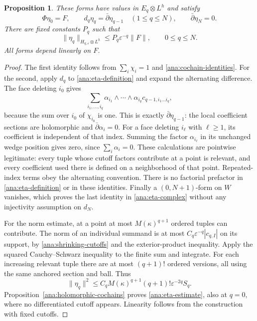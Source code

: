 \documentclass[11pt,reqno]{amsart}
\numberwithin{equation}{section}
\newtheorem{proposition}[theorem]{Proposition}
\theoremstyle{definition}
\theoremstyle{remark}
\begin{document}
\begin{proposition}\label{ana:eta-identities}
These forms have values in $E_q\otimes L^h$ and satisfy
\begin{equation}\label{ana:eta-complex}
 \Phi\eta_0=F,
 \qquad
 d_q\eta_q=\bar\partial\eta_{q-1}\quad(1\leq q\leq N),
 \qquad
 \bar\partial\eta_N=0.
\end{equation}
There are fixed constants $P_q$ such that
\begin{equation}\label{ana:eta-estimate}
 \|\eta_q\|_{H_{q,\varepsilon}\otimes L^h}
 \leq P_q\varepsilon^{-q}\|F\|,
 \qquad 0\leq q\leq N.
\end{equation}
All forms depend linearly on $F$.
\end{proposition}

\begin{proof}
The first identity follows from $\sum_i\chi_i=1$ and
\eqref{ana:cochain-identities}.  For the second, apply $d_q$ to
\eqref{ana:eta-definition} and expand the alternating difference.
The face deleting $i_0$ gives
\[
 \sum_{i_1,\ldots,i_q}
 \alpha_{i_1}\wedge\cdots\wedge\alpha_{i_q}
 c_{q-1,i_1\ldots i_q},
\]
because the sum over $i_0$ of $\chi_{i_0}$ is one.  This is
exactly $\bar\partial\eta_{q-1}$: the local coefficient sections
are holomorphic and $\bar\partial\alpha_i=0$.
For a face deleting $i_\ell$ with $\ell\geq1$, its coefficient is
independent of that index.  Summing the factor $\alpha_{i_\ell}$
in its unchanged wedge position gives zero, since
$\sum_i\alpha_i=0$.  These calculations are pointwise legitimate:
every tuple whose cutoff factors contribute at a point is relevant,
and every coefficient used there is defined on a neighborhood of
that point.  Repeated-index terms obey the alternating convention.
There is no factorial prefactor in \eqref{ana:eta-definition} or
in these identities.  Finally a $(0,N+1)$-form on $W$ vanishes,
which proves the last identity in \eqref{ana:eta-complex} without any
injectivity assumption on $d_N$.

For the norm estimate, at a point at most $M(\kappa)^{q+1}$
ordered tuples can contribute.  The norm of an individual summand
is at most $C_q\varepsilon^{-q}|c_{q,I}|$ on its support, by
\eqref{ana:shrinking-cutoffs} and the exterior-product inequality.
Apply the squared Cauchy--Schwarz inequality to the finite sum and
integrate.  For each increasing relevant tuple there are at most
$(q+1)!$ ordered versions, all using the same anchored section and
ball.  Thus
\[
 \|\eta_q\|^2
 \leq C_q M(\kappa)^{q+1}(q+1)!
        \varepsilon^{-2q} S_q.
\]
Proposition~\ref{ana:holomorphic-cochains} proves
\eqref{ana:eta-estimate}, also at $q=0$, where no differentiated
cutoff appears.  Linearity follows from the construction with
fixed cutoffs.
\end{proof}
\end{document}
